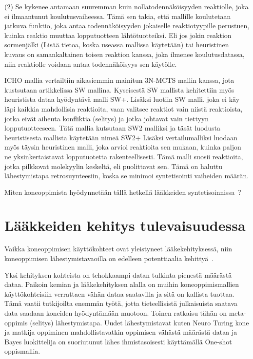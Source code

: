 \documentclass[finnish,twoside,censored,tkt,sw-line]{HYthesisML}
\begin{document}
(2) Se kykenee antamaan suuremman kuin nollatodennäköisyyden reaktiolle, joka ei ilmaantunut koulutusvaiheessa.
Tämä sen takia, että mallille koulutetaan jatkuva funktio, joka antaa todennäköisyyden jokaiselle reaktiotyypille perustuen, kuinka reaktio muuttaa lopputuotteen lähtötuotteiksi.
Eli jos jokin reaktion sormenjälki (Lisää tietoa, koska useassa mallissa käytetään) tai heuristinen kuvaus on samankaltainen toisen reaktion kanssa, joka ilmenee koulutusdatassa, niin reaktiolle voidaan antaa todennäköisyys sen käytölle.

ICHO mallia vertailtiin aikasiemmin mainitun 3N-MCTS mallin kanssa, jota kustsutaan artikkelissa SW mallina.
Kyseisestä SW mallista kehitettiin myös heuristista dataa hyödyntävä malli SW+.
Lisäksi luotiin SW malli, joka ei käy läpi kaikkia mahdollisia reaktioita, vaan valitsee reaktiot vain niistä reaktioista, jotka eivät aiheuta konfliktia (selitys) ja jotka johtavat vain tiettyyn lopputuotteeseen.
Tätä mallia kutsutaan SW2 malliksi ja täsät luodusta heuristisesta mallista käytetään nimeä SW2+
Lisäksi vertailumalliksi luodaan myös täysin heuristinen malli, joka arvioi reaktioita sen mukaan, kuinka paljon ne yksinkertaistavat lopputuotetta rakenteellisesti.
Tämä malli suosii reaktioita, jotka pilkkovat molekyylin keskeltä, eli puolittavat sen.
Tämä on haluttu lähestymistapa retrosuynteesiin, koska se minimoi syntetisointi vaiheiden määrän.


Miten koneoppimista hyödynnetään tällä hetkellä lääkkeiden syntetisoinnissa~\cite{SeglerMarwinHS2018Pcsw,ShaharHarelAndKiraRadinsky,ShinBonggun}?

\chapter{Lääkkeiden kehitys tulevaisuudessa}

Vaikka koneoppimisen käyttökohteet ovat yleistyneet lääkekehityksessä, niin koneoppimisen lähestymistavaoilla on edelleen potenttiaalia kehittyä~\cite{ButlerKeithT2018Mlfm}.

Yksi kehityksen kohteista on tehokkaampi datan tulkinta pienestä määrästä dataa.
Paikoin kemian ja lääkekehityksen alalla on muihin koneoppimismallien käyttökohteisiin verrattaen vähän dataa saatavilla ja sitä on kallista tuottaa.
Tämä vaatii tutkijoilta enemmän työtä, jotta tieteellisistä julkaisuista saatava data saadaan koneiden hyödyntämään muotoon.
Toinen ratkaisu tähän on meta-oppimis (selitys) lähestymistapa.
Uudet lähestymistavat kuten Neuro Turing kone ja matkija oppiminen mahdollistavatkin oppimisen vähästä määrästä dataa ja Bayes luokittelija on suoriutunut lähes ihmistasoisesti käyttämällä One-shot oppismallia.
\end{document}

